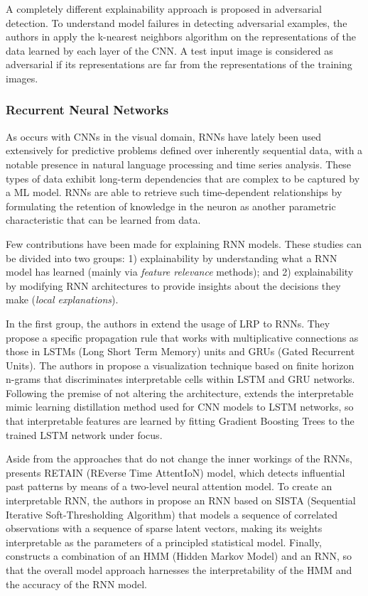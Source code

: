 \documentclass[final]{elsarticle}
\begin{document}
A completely different explainability approach is proposed in adversarial detection. To understand model failures in detecting adversarial examples, the authors in \cite{papernot2018deep} apply the k-nearest neighbors algorithm on the representations of the data learned by each layer of the CNN. A test input image  is considered as adversarial if its representations are far from the representations of the training images.

\subsubsection{Recurrent Neural Networks}

As occurs with CNNs in the visual domain, RNNs have lately been used extensively for predictive problems defined over inherently sequential data, with a notable presence in natural language processing and time series analysis. These types of data exhibit long-term dependencies that are complex to be captured by a ML model. RNNs are able to retrieve such time-dependent relationships by formulating the retention of knowledge in the neuron as another parametric characteristic that can be learned from data.  

Few contributions have been made for explaining RNN models. These studies can be divided into two groups: 1) explainability by understanding what a RNN model has learned (mainly via \textit{feature relevance} methods); and 2) explainability by modifying RNN architectures to provide insights about the decisions they make (\textit{local explanations}). 

In the first group, the authors in  \cite{ExplainingRNN} extend the usage of LRP to RNNs. They  propose a specific propagation rule that works with multiplicative connections as those in LSTMs (Long Short Term Memory) units and GRUs (Gated Recurrent Units). The authors in \cite{VisualizingUnderstandingRNN} propose a visualization technique based on finite horizon n-grams that discriminates interpretable cells within LSTM and GRU networks. Following the premise of not altering the architecture, \cite{DistillingRNN} extends the interpretable mimic learning distillation method used for CNN models to LSTM networks, so that interpretable features are learned by fitting Gradient Boosting Trees to the trained LSTM network under focus. 

Aside from the approaches that do not change the inner workings of the RNNs, \cite{RETAIN} presents RETAIN (REverse Time AttentIoN) model, which detects influential past patterns by means of a two-level neural attention model. To create an interpretable RNN, the authors in \cite{InterpretableRNN} propose an RNN based on SISTA (Sequential Iterative Soft-Thresholding Algorithm) that models a sequence of correlated observations with a sequence of sparse latent vectors, making its weights interpretable as the parameters of a principled statistical model. Finally, \cite{MarkovRNN} constructs a combination of an HMM (Hidden Markov Model) and an RNN, so that the overall model approach harnesses the interpretability of the HMM and the accuracy of the RNN model.
\end{document}
